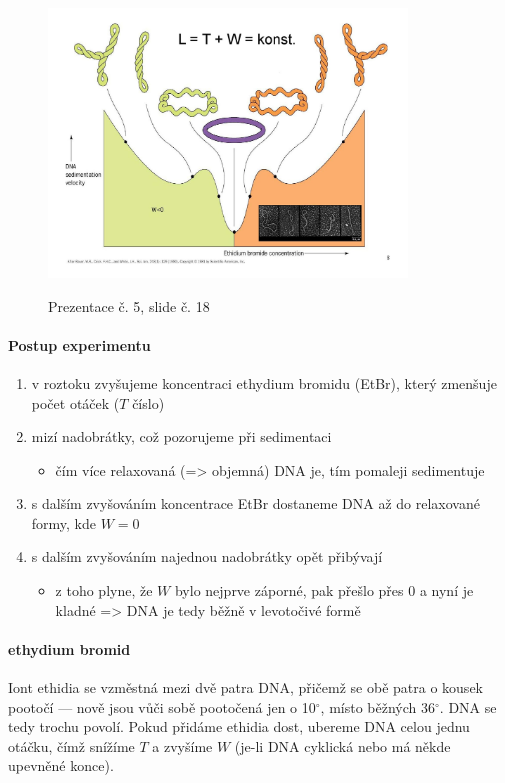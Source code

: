 \documentclass[DIV=8]{scrreprt}
\newcommand{\mybox}[2]{
    \paragraph{#1} #2
}
\begin{document}
\begin{figure}
    \caption{Prezentace č. 5, slide č. 18}
    \includegraphics[width=0.85\textwidth]{slides-5/slide-18.jpg}
    \centering
    \label{slides-5-slide-18}
\end{figure}

\paragraph{Postup experimentu}
\begin{enumerate}[nosep]
    \item v roztoku zvyšujeme koncentraci ethydium bromidu (EtBr), který zmenšuje počet otáček (\(T\) číslo)
    \item mizí nadobrátky, což pozorujeme při sedimentaci
\begin{itemize}[nosep]
    \item čím více relaxovaná (=> objemná) DNA je, tím pomaleji sedimentuje
\end{itemize}

    \item s dalším zvyšováním koncentrace EtBr dostaneme DNA až do relaxované formy, kde \(W = 0\)
    \item s dalším zvyšováním najednou nadobrátky opět přibývají
\begin{itemize}[nosep]
    \item z toho plyne, že \(W\) bylo nejprve záporné, pak přešlo přes 0 a nyní je kladné => DNA je tedy běžně v levotočivé formě
\end{itemize}

\end{enumerate}



\mybox{ethydium bromid}{Iont ethidia se vzměstná mezi dvě patra DNA, přičemž se obě patra o kousek pootočí --- nově jsou vůči sobě pootočená jen o 10\(^{\circ}\), místo běžných 36\(^{\circ}\). DNA se tedy trochu povolí. Pokud přidáme ethidia dost, ubereme DNA celou jednu otáčku, čímž snížíme \(T\) a zvyšíme \(W\) (je-li DNA cyklická nebo má někde upevněné konce).}
\end{document}
